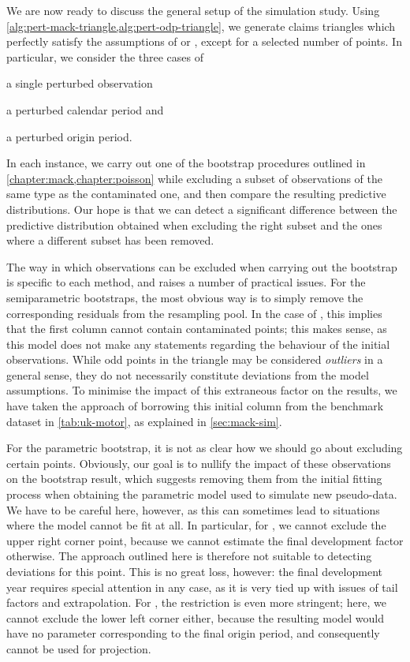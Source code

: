 \documentclass[a4paper]{book}
\begin{document}
We are now ready to discuss the general setup of the simulation study. Using \cref{alg:pert-mack-triangle,alg:pert-odp-triangle}, we generate claims triangles which perfectly satisfy the assumptions of  or , except for a selected number of points. In particular, we consider the three cases of
\begin{inparaenum}[(i)]
  \item a single perturbed observation
  \item a perturbed calendar period and
  \item a perturbed origin period.
\end{inparaenum}
In each instance, we carry out one of the bootstrap procedures outlined in \cref{chapter:mack,chapter:poisson} while excluding a subset of observations of the same type as the contaminated one, and then compare the resulting predictive distributions. Our hope is that we can detect a significant difference between the predictive distribution obtained when excluding the right subset and the ones where a different subset has been removed.

The way in which observations can be excluded when carrying out the bootstrap is specific to each method, and raises a number of practical issues. For the semiparametric bootstraps, the most obvious way is to simply remove the corresponding residuals from the resampling pool. In the case of , this implies that the first column cannot contain contaminated points; this makes sense, as this model does not make any statements regarding the behaviour of the initial observations. While odd points in the triangle may be considered \emph{outliers} in a general sense, they do not necessarily constitute deviations from the model assumptions. To minimise the impact of this extraneous factor on the results, we have taken the approach of borrowing this initial column from the benchmark dataset in \cref{tab:uk-motor}, as explained in \cref{sec:mack-sim}.

For the parametric bootstrap, it is not as clear how we should go about excluding certain points. Obviously, our goal is to nullify the impact of these observations on the bootstrap result, which suggests removing them from the initial fitting process when obtaining the parametric model used to simulate new pseudo-data. We have to be careful here, however, as this can sometimes lead to situations where the model cannot be fit at all. In particular, for , we cannot exclude the upper right corner point, because we cannot estimate the final development factor otherwise. The approach outlined here is therefore not suitable to detecting deviations for this point. This is no great loss, however: the final development year requires special attention in any case, as it is very tied up with issues of tail factors and extrapolation. For , the restriction is even more stringent; here, we cannot exclude the lower left corner either, because the resulting model would have no parameter corresponding to the final origin period, and consequently cannot be used for projection.
\end{document}
